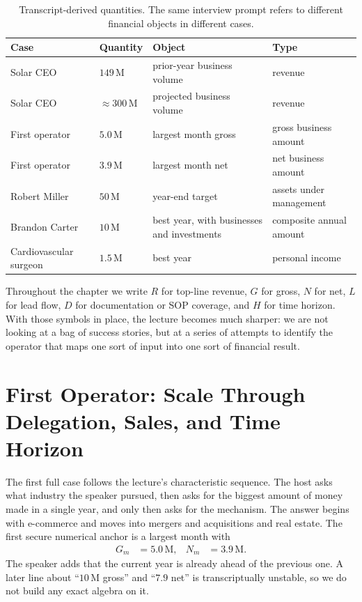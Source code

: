 \begin{table}[h]
\centering
\begin{tabular}{llll}
\hline
Case & Quantity & Object & Type \\
\hline
Solar CEO & \(149\,\mathrm{M}\) & prior-year business volume & revenue \\
Solar CEO & \(\approx 300\,\mathrm{M}\) & projected business volume & revenue \\
First operator & \(5.0\,\mathrm{M}\) & largest month gross & gross business amount \\
First operator & \(3.9\,\mathrm{M}\) & largest month net & net business amount \\
Robert Miller & \(50\,\mathrm{M}\) & year-end target & assets under management \\
Brandon Carter & \(10\,\mathrm{M}\) & best year, with businesses and investments & composite annual amount \\
Cardiovascular surgeon & \(1.5\,\mathrm{M}\) & best year & personal income \\
\hline
\end{tabular}
\caption{Transcript-derived quantities. The same interview prompt refers to different financial objects in different cases.}
\end{table}

Throughout the chapter we write \(R\) for top-line revenue, \(G\) for gross, \(N\) for net, \(L\) for lead flow, \(D\) for documentation or SOP coverage, and \(H\) for time horizon. With those symbols in place, the lecture becomes much sharper: we are not looking at a bag of success stories, but at a series of attempts to identify the operator that maps one sort of input into one sort of financial result.

\section{First Operator: Scale Through Delegation, Sales, and Time Horizon}

The first full case follows the lecture's characteristic sequence. The host asks what industry the speaker pursued, then asks for the biggest amount of money made in a single year, and only then asks for the mechanism. The answer begins with e-commerce and moves into mergers and acquisitions and real estate. The first secure numerical anchor is a largest month with
\begin{align}
G_m &= 5.0\,\mathrm{M}, &
N_m &= 3.9\,\mathrm{M}.
\end{align}
The speaker adds that the current year is already ahead of the previous one. A later line about ``\(10\,\mathrm{M}\) gross'' and ``\(7.9\) net'' is transcriptually unstable, so we do not build any exact algebra on it.

